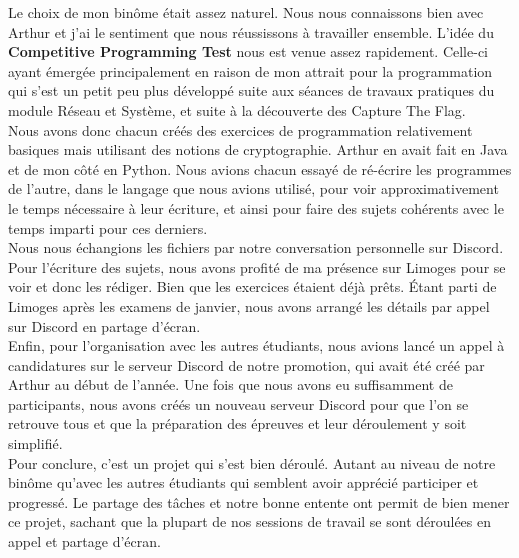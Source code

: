 \documentclass[12pt]{article}
\begin{document}
Le choix de mon binôme était assez naturel. Nous nous connaissons bien avec Arthur et j'ai le sentiment que nous réussissons à travailler ensemble. L'idée du \textbf{Competitive Programming Test} nous est venue assez rapidement. Celle-ci ayant émergée principalement en raison de mon attrait pour la programmation qui s'est un petit peu plus développé suite aux séances de travaux pratiques du module \textsf{Réseau et Système}, et suite à la découverte des \textsf{Capture The Flag}.\\
Nous avons donc chacun créés des exercices de programmation relativement basiques mais utilisant des notions de cryptographie. Arthur en avait fait en Java et de mon côté en Python. Nous avions chacun essayé de ré-écrire les programmes de l'autre, dans le langage que nous avions utilisé, pour voir approximativement le temps nécessaire à leur écriture, et ainsi pour faire des sujets cohérents avec le temps imparti pour ces derniers.\\
Nous nous échangions les fichiers par notre conversation personnelle sur Discord. Pour l'écriture des sujets, nous avons profité de ma présence sur Limoges pour se voir et donc les rédiger. Bien que les exercices étaient déjà prêts. Étant parti de Limoges après les examens de janvier, nous avons arrangé les détails par appel sur Discord en partage d'écran. \\
Enfin, pour l'organisation avec les autres étudiants, nous avions lancé un appel à candidatures sur le serveur Discord de notre promotion, qui avait été créé par Arthur au début de l'année. Une fois que nous avons eu suffisamment de participants, nous avons créés un nouveau serveur Discord pour que l'on se retrouve tous et que la préparation des épreuves et leur déroulement y soit simplifié.\\
Pour conclure, c'est un projet qui s'est bien déroulé. Autant au niveau de notre binôme qu'avec les autres étudiants qui semblent avoir apprécié participer et progressé. Le partage des tâches et notre bonne entente ont permit de bien mener ce projet, sachant que la plupart de nos sessions de travail se sont déroulées en appel et partage d'écran.
\end{document}
